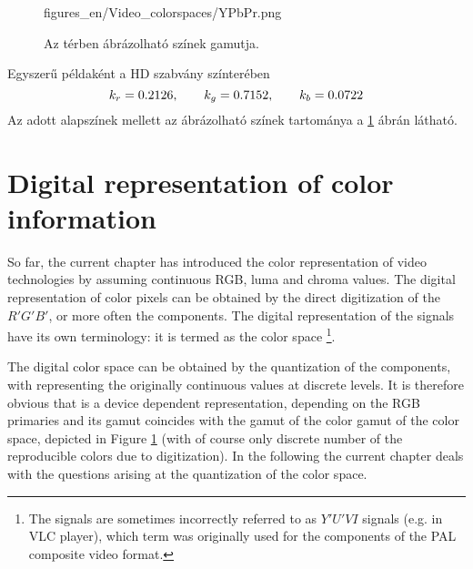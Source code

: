 \begin{figure}[]
	\centering
	\begin{minipage}[c]{0.6\textwidth}
	\begin{overpic}[width = 1\columnwidth ]{figures_en/Video_colorspaces/YPbPr.png}
	\end{overpic} \end{minipage}\hfill
	\begin{minipage}[c]{0.4\textwidth}
	\caption{Az \ypbpr térben ábrázolható színek gamutja.}
	\label{Fig:ypbpr_gamut}  \end{minipage}
\end{figure}
Egyszerű példaként a HD szabvány színterében 
\begin{equation}
k_r = 0.2126, \hspace{7mm}
k_g = 0.7152, \hspace{7mm}
k_b = 0.0722
\end{equation}
Az adott alapszínek mellett az ábrázolható színek tartománya a \ref{Fig:ypbpr_gamut} ábrán látható.

\section{Digital representation of color information}

So far, the current chapter has introduced the color representation of video technologies by assuming continuous RGB, luma and chroma values.
The digital representation of color pixels can be obtained by the direct digitization of the $R'G'B'$, or more often the \ypbpr components.
The digital representation of the \ypbpr signals have its own terminology: it is termed as the \ycbcr color space \footnote{
The \ycbcr signals are sometimes incorrectly referred to as $Y'U'VI$ signals (e.g. in VLC player), which term was originally used for the components of the PAL composite video format.}.

The \ycbcr digital color space can be obtained by the quantization of the \ypbpr components, with representing the originally continuous values at discrete levels.
It is therefore obvious that \ycbcr is a device dependent representation, depending on the RGB primaries and its gamut coincides with the gamut of the color gamut of the \ypbpr color space, depicted in Figure \ref{Fig:ypbpr_gamut} (with of course only discrete number of the reproducible colors due to digitization).
In the following the current chapter deals with the questions arising at the quantization of the \ypbpr color space.


